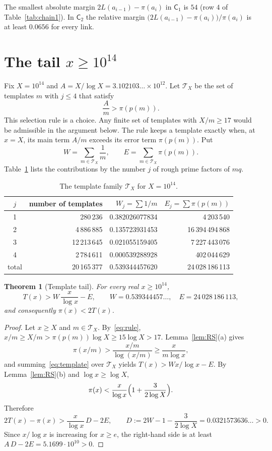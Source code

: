 \documentclass[11pt,a4paper]{article}
\newtheorem{theorem}{Theorem}[section]
\theoremstyle{definition}
\newcommand{\cT}{\mathcal T}
\begin{document}
The smallest absolute margin $2L(a_{i-1})-\pi(a_i)$ in $\mathsf C_1$ is $54$ (row $4$ of Table~\ref{tab:chain1}). In $\mathsf C_2$ the relative margin $\bigl(2L(a_{i-1})-\pi(a_i)\bigr)/\pi(a_i)$ is at least $0.0656$ for every link.

\section{The tail \texorpdfstring{$x\ge10^{14}$}{x >= 1e14}}\label{sec:tail}

Fix $X=10^{14}$ and $A=X/\log X=3.102103\ldots\times10^{12}$. Let $\cT_X$ be the set of templates $m$ with $j\le4$ that satisfy
\begin{equation}\label{eq:rule}
\frac{A}{m}>\pi(p(m)).
\end{equation}
This selection rule is a choice. Any finite set of templates with $X/m\ge17$ would be admissible in the argument below. The rule keeps a template exactly when, at $x=X$, its main term $A/m$ exceeds its error term $\pi(p(m))$. Put
\[
W=\sum_{m\in\cT_X}\frac1m,\qquad E=\sum_{m\in\cT_X}\pi(p(m)).
\]
Table~\ref{tab:tail} lists the contributions by the number $j$ of rough prime factors of $mq$.

\begin{table}[ht]
\centering
\caption{The template family $\cT_X$ for $X=10^{14}$.}\label{tab:tail}
\begin{tabular}{crrr}
\toprule
$j$ & number of templates & $W_j=\sum 1/m$ & $E_j=\sum\pi(p(m))$\\
\midrule
1 & 280\,236 & 0.382026077834 & 4\,203\,540\\
2 & 4\,886\,885 & 0.135723931453 & 16\,394\,494\,868\\
3 & 12\,213\,645 & 0.021055159405 & 7\,227\,443\,076\\
4 & 2\,784\,611 & 0.000539288928 & 402\,044\,629\\
\midrule
total & 20\,165\,377 & 0.539344457620 & 24\,028\,186\,113\\
\bottomrule
\end{tabular}
\end{table}

\begin{theorem}[Template tail]\label{thm:tail}
For every real $x\ge10^{14}$,
\[
T(x)>W\,\frac{x}{\log x}-E,\qquad W=0.539344457\ldots,\quad E=24\,028\,186\,113,
\]
and consequently $\pi(x)<2T(x)$.
\end{theorem}

\begin{proof}
Let $x\ge X$ and $m\in\cT_X$. By~\eqref{eq:rule}, $x/m\ge X/m>\pi(p(m))\log X\ge15\log X>17$. Lemma~\ref{lem:RS}(a) gives
\[
\pi(x/m)>\frac{x/m}{\log(x/m)}\ge\frac{x}{m\log x},
\]
and summing~\eqref{eq:template} over $\cT_X$ yields $T(x)>Wx/\log x-E$. By Lemma~\ref{lem:RS}(b) and $\log x\ge\log X$,
\[
\pi(x)<\frac{x}{\log x}\Bigl(1+\frac{3}{2\log X}\Bigr).
\]
Therefore
\[
2T(x)-\pi(x)>\frac{x}{\log x}\,D-2E,\qquad D:=2W-1-\frac{3}{2\log X}=0.0321573636\ldots>0.
\]
Since $x/\log x$ is increasing for $x\ge e$, the right-hand side is at least $A\,D-2E=5.1699\cdot10^{10}>0$.
\end{proof}
\end{document}
